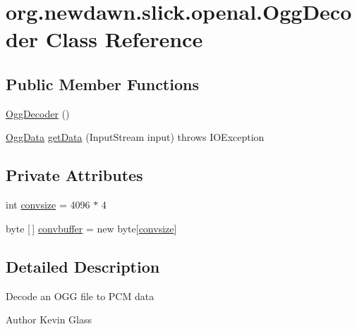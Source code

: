 \hypertarget{classorg_1_1newdawn_1_1slick_1_1openal_1_1_ogg_decoder}{}\section{org.\+newdawn.\+slick.\+openal.\+Ogg\+Decoder Class Reference}
\label{classorg_1_1newdawn_1_1slick_1_1openal_1_1_ogg_decoder}
\subsection*{Public Member Functions}
\begin{DoxyCompactItemize}
\item 
\mbox{\hyperlink{classorg_1_1newdawn_1_1slick_1_1openal_1_1_ogg_decoder_a488989a7dc984344c96fa2118f72539a}{Ogg\+Decoder}} ()
\item 
\mbox{\hyperlink{namespaceorg_1_1newdawn_1_1slick_1_1openal_classorg_1_1newdawn_1_1slick_1_1openal_1_1_ogg_data}{Ogg\+Data}} \mbox{\hyperlink{classorg_1_1newdawn_1_1slick_1_1openal_1_1_ogg_decoder_a0710a2de5e29602d1486f42281082f70}{get\+Data}} (Input\+Stream input)  throws I\+O\+Exception 
\end{DoxyCompactItemize}
\subsection*{Private Attributes}
\begin{DoxyCompactItemize}
\item 
int \mbox{\hyperlink{classorg_1_1newdawn_1_1slick_1_1openal_1_1_ogg_decoder_a520d588229e32d6047b78ac47c9eb70d}{convsize}} = 4096 $\ast$ 4
\item 
byte \mbox{[}$\,$\mbox{]} \mbox{\hyperlink{classorg_1_1newdawn_1_1slick_1_1openal_1_1_ogg_decoder_aaeb004d8dbc65576df116614fe9f9824}{convbuffer}} = new byte\mbox{[}\mbox{\hyperlink{classorg_1_1newdawn_1_1slick_1_1openal_1_1_ogg_decoder_a520d588229e32d6047b78ac47c9eb70d}{convsize}}\mbox{]}
\end{DoxyCompactItemize}


\subsection{Detailed Description}
Decode an O\+GG file to P\+CM data

\begin{DoxyAuthor}{Author}
Kevin Glass 
\end{DoxyAuthor}


